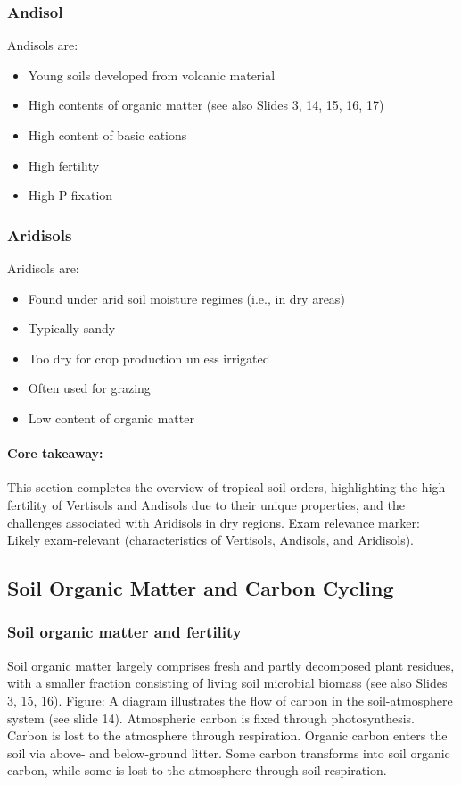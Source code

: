 \subsubsection{Andisol} Andisols are: 

\begin{itemize} 
    \item Young soils developed from volcanic material 
    \item High contents of organic matter (see also Slides 3, 14, 15, 16, 17) 
    \item High content of basic cations 
    \item High fertility 
    \item High P fixation 
\end{itemize}

\subsubsection{Aridisols} 
Aridisols are: 
\begin{itemize} 
    \item Found under arid soil moisture regimes (i.e., in dry areas) 
    \item Typically sandy 
    \item Too dry for crop production unless irrigated 
    \item Often used for grazing 
    \item Low content of organic matter 
\end{itemize}

\paragraph*{Core takeaway:} 
This section completes the overview of tropical soil orders, highlighting the high fertility of Vertisols and Andisols due to their unique properties, and the challenges associated with Aridisols in dry regions. Exam relevance marker: Likely exam-relevant (characteristics of Vertisols, Andisols, and Aridisols).

\subsection{Soil Organic Matter and Carbon Cycling} \subsubsection{Soil organic matter and fertility} 
Soil organic matter largely comprises fresh and partly decomposed plant residues, with a smaller fraction consisting of living soil microbial biomass (see also Slides 3, 15, 16). Figure: A diagram illustrates the flow of carbon in the soil-atmosphere system (see slide 14). Atmospheric carbon is fixed through photosynthesis. Carbon is lost to the atmosphere through respiration. Organic carbon enters the soil via above- and below-ground litter. Some carbon transforms into soil organic carbon, while some is lost to the atmosphere through soil respiration.

